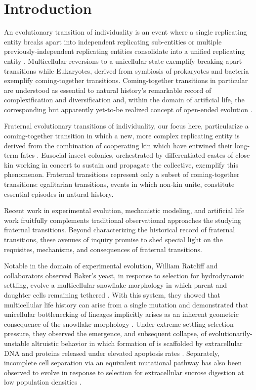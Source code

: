\section{Introduction}

An evolutionary transition of individuality is an event where a single replicating entity breaks apart into independent replicating sub-entities or multiple previously-independent replicating entities consolidate into a unified replicating entity \citep{smith1997major}.
Multicellular reversions to a unicellular state exemplify breaking-apart transitions \citep{libby2016stabilizing} while Eukaryotes, derived from symbiosis of prokaryotes and bacteria exemplify coming-together transitions.
Coming-together transitions in particular are understood as essential to natural history's remarkable record of complexification and diversification \citep{smith1997major} and, within the domain of artificial life, the corresponding but apparently yet-to-be realized concept of open-ended evolution \citep{taylor2016open, banzhaf2016defining}.

Fraternal evolutionary transitions of individuality, our focus here, particularize a coming-together transition in which a new, more complex replicating entity is derived from the combination of cooperating kin which have entwined their long-term fates \citep{west2015major}.
Eusocial insect colonies, orchestrated by differentiated castes of close kin working in concert to sustain and propagate the collective, exemplify this phenomenon.
Fraternal transitions represent only a subset of coming-together transitions: egalitarian transitions, events in which non-kin unite, constitute essential episodes in natural history.

Recent work in experimental evolution, mechanistic modeling, and artificial life work fruitfully complements traditional observational approaches the studying fraternal transitions.
Beyond characterizing the historical record of fraternal transitions, these avenues of inquiry promise to shed special light on the requisites, mechanisms, and consequences of fraternal transitions.

Notable in the domain of experimental evolution, William Ratcliff and collaborators observed Baker's yeast, in response to selection for hydrodynamic settling, evolve a multicellular snowflake morphology in which parent and daughter cells remaining tethered \citep{ratcliff2014experimental}.
With this system, they showed that multicellular life history can arise from a single mutation and demonstrated that unicellular bottlenecking of lineages implicitly arises as an inherent geometric consequence of the snowflake morphology \citep{ratcliff2015origins}.
Under extreme settling selection pressure, they observed the emergence, and subsequent collapse, of evolutionarily-unstable altruistic behavior in which formation of is scaffolded by extracellular DNA and proteins released under elevated apoptosis rates \citep{gulli2019evolution}.
Separately, incomplete cell separation via an equivalent mutational pathway has also been observed to evolve in response to selection for extracellular sucrose digestion at low population densities \citep{koschwanez2013improved}.

